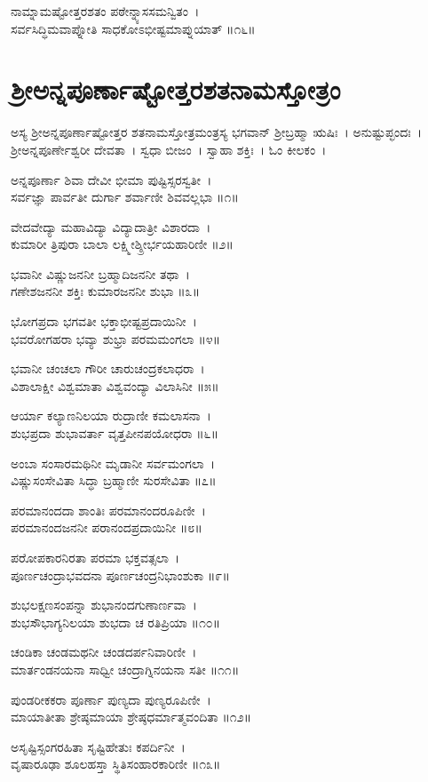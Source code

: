 ನಾಮ್ನಾಮಷ್ಟೋತ್ತರಶತಂ ಪಠೇನ್ನ್ಯಾಸಸಮನ್ವಿತಂ~।\\
ಸರ್ವಸಿದ್ಧಿಮವಾಪ್ನೋತಿ ಸಾಧಕೋಽಭೀಷ್ಟಮಾಪ್ನುಯಾತ್ ॥೧೬॥
\newpage\section{ಶ್ರೀಅನ್ನಪೂರ್ಣಾಷ್ಟೋತ್ತರಶತನಾಮಸ್ತೋತ್ರಂ }
ಅಸ್ಯ ಶ್ರೀಅನ್ನಪೂರ್ಣಾಷ್ಟೋತ್ತರ ಶತನಾಮಸ್ತೋತ್ರಮಂತ್ರಸ್ಯ ಭಗವಾನ್ ಶ್ರೀಬ್ರಹ್ಮಾ ಋಷಿಃ~। ಅನುಷ್ಟುಪ್ಛಂದಃ~। ಶ್ರೀಅನ್ನಪೂರ್ಣೇಶ್ವರೀ ದೇವತಾ~। ಸ್ವಧಾ ಬೀಜಂ~। ಸ್ವಾಹಾ ಶಕ್ತಿಃ~। ಓಂ ಕೀಲಕಂ~।

ಅನ್ನಪೂರ್ಣಾ ಶಿವಾ ದೇವೀ ಭೀಮಾ ಪುಷ್ಟಿಸ್ಸರಸ್ವತೀ~।\\
ಸರ್ವಜ್ಞಾ ಪಾರ್ವತೀ ದುರ್ಗಾ ಶರ್ವಾಣೀ ಶಿವವಲ್ಲಭಾ ॥೧॥

ವೇದವೇದ್ಯಾ ಮಹಾವಿದ್ಯಾ ವಿದ್ಯಾದಾತ್ರೀ ವಿಶಾರದಾ~।\\
ಕುಮಾರೀ ತ್ರಿಪುರಾ ಬಾಲಾ ಲಕ್ಷ್ಮೀಶ್ಶ್ರೀರ್ಭಯಹಾರಿಣೀ ॥೨॥

ಭವಾನೀ ವಿಷ್ಣುಜನನೀ ಬ್ರಹ್ಮಾದಿಜನನೀ ತಥಾ~।\\
ಗಣೇಶಜನನೀ ಶಕ್ತಿಃ ಕುಮಾರಜನನೀ ಶುಭಾ ॥೩॥

ಭೋಗಪ್ರದಾ ಭಗವತೀ ಭಕ್ತಾಭೀಷ್ಟಪ್ರದಾಯಿನೀ~।\\
ಭವರೋಗಹರಾ ಭವ್ಯಾ ಶುಭ್ರಾ ಪರಮಮಂಗಲಾ ॥೪॥

ಭವಾನೀ ಚಂಚಲಾ ಗೌರೀ ಚಾರುಚಂದ್ರಕಲಾಧರಾ~।\\
ವಿಶಾಲಾಕ್ಷೀ ವಿಶ್ವಮಾತಾ ವಿಶ್ವವಂದ್ಯಾ ವಿಲಾಸಿನೀ ॥೫॥

ಆರ್ಯಾ ಕಲ್ಯಾಣನಿಲಯಾ ರುದ್ರಾಣೀ ಕಮಲಾಸನಾ~।\\
ಶುಭಪ್ರದಾ ಶುಭಾವರ್ತಾ ವೃತ್ತಪೀನಪಯೋಧರಾ ॥೬॥

ಅಂಬಾ ಸಂಸಾರಮಥಿನೀ ಮೃಡಾನೀ ಸರ್ವಮಂಗಲಾ~।\\
ವಿಷ್ಣುಸಂಸೇವಿತಾ ಸಿದ್ಧಾ ಬ್ರಹ್ಮಾಣೀ ಸುರಸೇವಿತಾ ॥೭॥

ಪರಮಾನಂದದಾ ಶಾಂತಿಃ ಪರಮಾನಂದರೂಪಿಣೀ~।\\
ಪರಮಾನಂದಜನನೀ ಪರಾನಂದಪ್ರದಾಯಿನೀ ॥೮॥

ಪರೋಪಕಾರನಿರತಾ ಪರಮಾ ಭಕ್ತವತ್ಸಲಾ~।\\
ಪೂರ್ಣಚಂದ್ರಾಭವದನಾ ಪೂರ್ಣಚಂದ್ರನಿಭಾಂಶುಕಾ ॥೯॥

ಶುಭಲಕ್ಷಣಸಂಪನ್ನಾ ಶುಭಾನಂದಗುಣಾರ್ಣವಾ~।\\
ಶುಭಸೌಭಾಗ್ಯನಿಲಯಾ ಶುಭದಾ ಚ ರತಿಪ್ರಿಯಾ ॥೧೦॥

ಚಂಡಿಕಾ ಚಂಡಮಥನೀ ಚಂಡದರ್ಪನಿವಾರಿಣೀ~।\\
ಮಾರ್ತಂಡನಯನಾ ಸಾಧ್ವೀ ಚಂದ್ರಾಗ್ನಿನಯನಾ ಸತೀ ॥೧೧॥

ಪುಂಡರೀಕಕರಾ ಪೂರ್ಣಾ ಪುಣ್ಯದಾ ಪುಣ್ಯರೂಪಿಣೀ~।\\
ಮಾಯಾತೀತಾ ಶ್ರೇಷ್ಠಮಾಯಾ ಶ್ರೇಷ್ಠಧರ್ಮಾತ್ಮವಂದಿತಾ ॥೧೨॥

ಅಸೃಷ್ಟಿಸ್ಸಂಗರಹಿತಾ ಸೃಷ್ಟಿಹೇತುಃ ಕಪರ್ದಿನೀ~।\\
ವೃಷಾರೂಢಾ ಶೂಲಹಸ್ತಾ ಸ್ಥಿತಿಸಂಹಾರಕಾರಿಣೀ ॥೧೩॥

